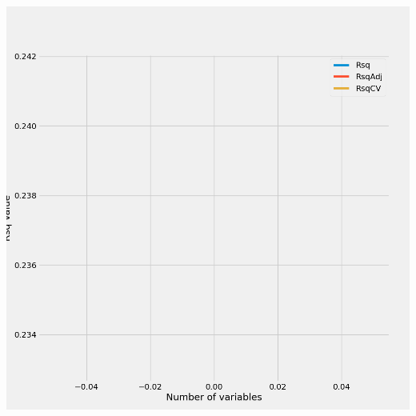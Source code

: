 \documentclass{article}
\begin{document}
	\includegraphics[scale = 0.2]{../plots/python/ConcreteStepwise4L.png}
	
\end{document}
